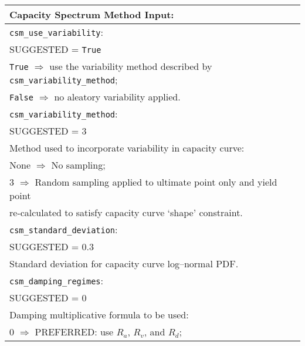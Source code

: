 \vspace{2em}
\begin{tabular}{|p{\textwidth}|}
\hline
\vspace{0.3em} \noindent \Large \textbf{Capacity Spectrum Method Input:} \normalsize \\
\hline \vspace{0.1em} \texttt{csm\_use\_variability}: \\
SUGGESTED = \texttt{True} \\
\hspace{0.5em} \texttt{True} $\Rightarrow$ use the variability method described by
\texttt{csm\_variability\_method};    \\
\hspace{0.5em} \texttt{False} $\Rightarrow$ no aleatory variability applied.  \\
\hline \vspace{0.1em} \texttt{csm\_variability\_method}: \\
SUGGESTED = 3 \\
Method used to incorporate variability in capacity curve\index{capacity curve}: \\
 \hspace{0.5em} None $\Rightarrow$ No sampling; \\
 \hspace{0.5em} 3 $\Rightarrow$ Random sampling applied to ultimate
 point only and yield point \\
 \hspace{2.5em} re-calculated to satisfy capacity curve `shape' constraint. \\
\hline \vspace{0.1em} \texttt{csm\_standard\_deviation}: \\
SUGGESTED = 0.3 \\
Standard deviation for capacity curve\index{capacity curve} log--normal PDF.      \\
\hline \vspace{0.1em} \texttt{csm\_damping\_regimes}: \\
SUGGESTED = 0 \\
 Damping multiplicative formula to be
used: \\
 \hspace{0.5em} 0 $\Rightarrow$ \small{PREFERRED}: use $R_a$, $R_v$, and $R_d$; \\

\end{tabular}
